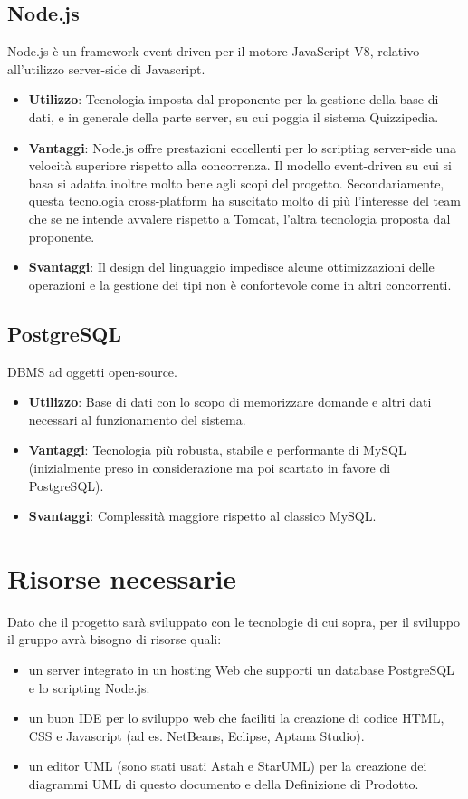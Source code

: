 \documentclass[a4paper,11pt]{article}
\begin{document}
	\subsection{Node.js}
	 Node.js è un framework event-driven per il motore JavaScript V8, relativo all'utilizzo server-side di Javascript.
	\begin{itemize}
		\item\textbf{Utilizzo}: Tecnologia imposta dal proponente per la gestione della base di dati, e in generale della parte server, su cui poggia il sistema Quizzipedia.
		\item\textbf{Vantaggi}: Node.js offre prestazioni eccellenti per lo scripting server-side una velocità superiore rispetto alla concorrenza. Il modello event-driven su cui si basa si adatta inoltre molto bene agli scopi del progetto. Secondariamente, questa tecnologia cross-platform ha suscitato molto di più l'interesse del team che se ne intende avvalere rispetto a Tomcat, l'altra tecnologia proposta dal proponente.
		\item\textbf{Svantaggi}: Il design del linguaggio impedisce alcune ottimizzazioni delle operazioni e la gestione dei tipi non è confortevole come in altri concorrenti.
	\end{itemize}
	\subsection{PostgreSQL}
	DBMS ad oggetti open-source.
	\begin{itemize}
		\item\textbf{Utilizzo}: Base di dati con lo scopo di memorizzare domande e altri dati necessari al funzionamento del sistema.
		\item\textbf{Vantaggi}: Tecnologia più robusta, stabile e performante di MySQL (inizialmente preso in considerazione ma poi scartato in favore di PostgreSQL).
		\item\textbf{Svantaggi}: Complessità maggiore rispetto al classico MySQL.
	\end{itemize}
	\newpage
	
	\section{Risorse necessarie}
	Dato che il progetto sarà sviluppato con le tecnologie di cui sopra, per il sviluppo il gruppo avrà bisogno di risorse quali:
	\begin{itemize}
	\item un server integrato in un hosting Web che supporti un database PostgreSQL e lo scripting Node.js.
	\item un buon IDE per lo sviluppo web che faciliti la creazione di codice HTML, CSS e Javascript (ad es. NetBeans, Eclipse, Aptana Studio).
	\item un editor UML (sono stati usati Astah e StarUML) per la creazione dei diagrammi UML  di questo documento e della Definizione di Prodotto.
	\end{itemize}
	\newpage
	
\end{document}
